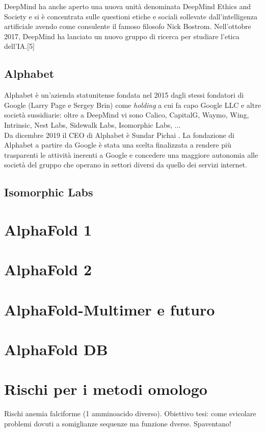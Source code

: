 DeepMind ha anche aperto una nuova unità denominata DeepMind Ethics and Society e si è concentrata sulle questioni etiche e sociali sollevate dall'intelligenza artificiale avendo come consulente il famoso filosofo Nick Bostrom. Nell'ottobre 2017, DeepMind ha lanciato un nuovo gruppo di ricerca per studiare l'etica dell'IA.[5]

\subsection{Alphabet}
Alphabet è un'azienda statunitense fondata nel 2015 dagli stessi fondatori di Google (Larry Page e Sergey Brin) come \textit{holding} a cui fa capo Google LLC e altre società sussidiarie: oltre a DeepMind vi sono Calico, CapitalG, Waymo, Wing, Intrinsic, Nest Labs, Sidewalk Labs, Isomorphic Labs, ...\\ 
Da dicembre 2019 il CEO di Alphabet è Sundar Pichai \cite{cnbc}.
La fondazione di Alphabet a partire da Google è stata una scelta finalizzata a rendere più trasparenti le attività inerenti a Google e concedere una maggiore autonomia alle società del gruppo che operano in settori diversi da quello dei servizi internet.

\subsection{Isomorphic Labs}



\section{AlphaFold 1}
\section{AlphaFold 2}
\section{AlphaFold-Multimer e futuro}
\section{AlphaFold DB}



\section{Rischi per i metodi omologo}
Rischi anemia falciforme (1 amminoacido diverso).
Obiettivo tesi: come svicolare problemi dovuti a somiglianze sequenze ma funzione dverse. Spaventano! 
